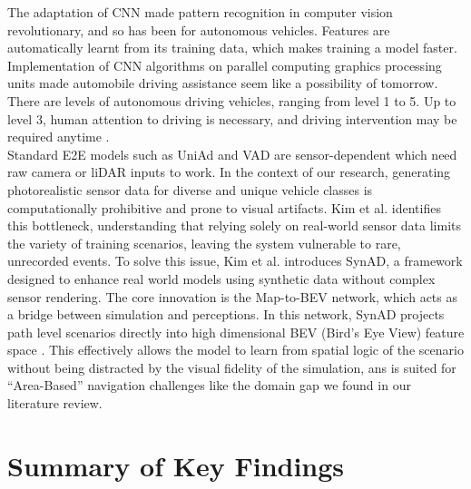 The adaptation of CNN made pattern recognition in computer vision revolutionary, and so has been for autonomous vehicles. Features are automatically learnt from its training data, which makes training a model faster. Implementation of CNN algorithms on parallel computing graphics processing units made automobile driving assistance seem like a possibility of tomorrow. There are levels of autonomous driving vehicles, ranging from level 1 to 5. Up to level 3, human attention to driving is necessary, and driving intervention may be required anytime \cite{Bojarski2016EndToEnd}.\\

Standard E2E models such as UniAd and VAD are sensor-dependent which need raw camera or liDAR inputs to work. In the context of our research, generating photorealistic sensor data for diverse and unique vehicle classes is computationally prohibitive and prone to visual artifacts. Kim et al. \cite{Kim2025SynAD} identifies this bottleneck, understanding that relying solely on real-world sensor data limits the variety of training scenarios, leaving the system vulnerable to rare, unrecorded events. To solve this issue, Kim et al. \cite{Kim2025SynAD} introduces SynAD, a framework designed to enhance real world models using synthetic data without complex sensor rendering. The core innovation is the Map-to-BEV network, which acts as a bridge between simulation and perceptions. In this network, SynAD projects path level scenarios directly into high dimensional BEV (Bird’s Eye View) feature space \cite{Li2022BEVFormer}. This effectively allows the model to learn from spatial logic of the scenario without being distracted by the visual fidelity of the simulation, ans is suited for “Area-Based” navigation challenges like the domain gap we found in our literature review.\\

 
\section{Summary of Key Findings}

